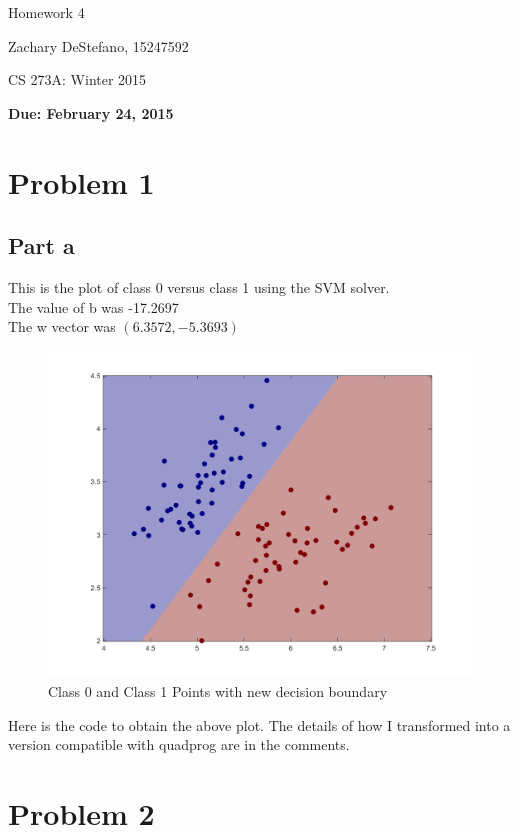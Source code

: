 \documentclass[twoside,11pt]{article}
\theoremstyle{definition}
\begin{document}
\centerline{\Large Homework 4}
\centerline{Zachary DeStefano, 15247592}
\centerline{CS 273A: Winter 2015}
\centerline{\bf Due: February 24, 2015}

\section*{Problem 1}

\subsection*{Part a}

This is the plot of class 0 versus class 1 using the SVM solver.\\
The value of b was -17.2697\\
The w vector was $(6.3572,-5.3693)$\\

\begin{figure}[h]
\centering
\includegraphics[width=5 in]{prob1Plot1.png}
\caption{Class 0 and Class 1 Points with new decision boundary}
\end{figure}

Here is the code to obtain the above plot. The details of how I transformed into a version compatible with quadprog are in the comments. 


\newpage

\section*{Problem 2}
\end{document}
